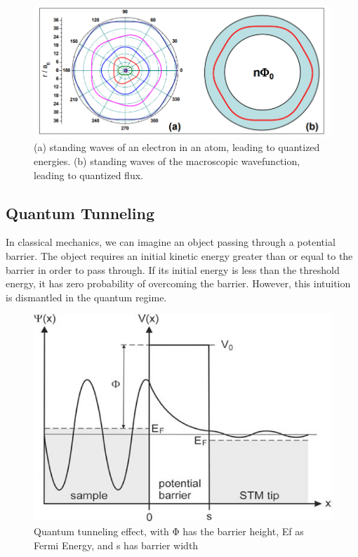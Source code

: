 \documentclass[conf]{new-aiaa}
\begin{document}
\begin{figure}[!ht]
    \centering
    \includegraphics[scale = 0.7]{standingWaves.PNG}
    \caption{(a) standing waves of an electron in an atom, leading to quantized energies. (b) standing waves of the macroscopic wavefunction, leading to quantized flux.}
    \label{fig:my_label}
\end{figure}
\subsection{Quantum Tunneling}
In classical mechanics, we can imagine an object passing through a potential barrier. The object requires an initial kinetic energy greater than or equal to the barrier in order to pass through. If its initial energy is less than the threshold energy, it has zero probability of overcoming the barrier. However, this intuition is dismantled in the quantum regime. 


\begin{figure}[!ht]
    \centering
    \includegraphics[scale = 3.0]{tunneling.png}
    \caption{Quantum tunneling effect, with Φ has the barrier height, Ef as Fermi Energy, and s has barrier width}
    \label{fig:my_label}
\end{figure}
\end{document}
